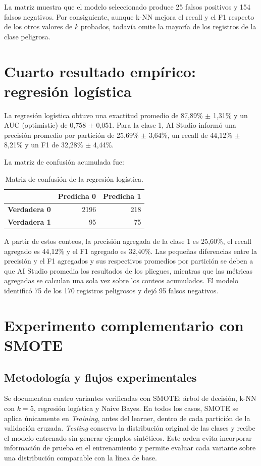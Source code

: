 \documentclass[12pt,a4paper]{article}
\begin{document}
La matriz muestra que el modelo seleccionado produce 25 falsos positivos y 154 falsos negativos. Por consiguiente, aunque k-NN mejora el recall y el F1 respecto de los otros valores de $k$ probados, todavía omite la mayoría de los registros de la clase peligrosa.

\section{Cuarto resultado empírico: regresión logística}
La regresión logística obtuvo una exactitud promedio de 87,89\% $\pm$ 1,31\% y un AUC (optimistic) de 0,758 $\pm$ 0,051. Para la clase 1, AI Studio informó una precisión promedio por partición de 25,69\% $\pm$ 3,64\%, un recall de 44,12\% $\pm$ 8,21\% y un F1 de 32,28\% $\pm$ 4,44\%.

La matriz de confusión acumulada fue:
\begin{table}[H]
\centering
\caption{Matriz de confusión de la regresión logística.}
\label{tab:logistic-matrix}
\begin{tabular}{lrr}
\toprule
 & \textbf{Predicha 0} & \textbf{Predicha 1} \\
\midrule
\textbf{Verdadera 0} & 2196 & 218 \\
\textbf{Verdadera 1} & 95 & 75 \\
\bottomrule
\end{tabular}
\end{table}

A partir de estos conteos, la precisión agregada de la clase 1 es 25,60\%, el recall agregado es 44,12\% y el F1 agregado es 32,40\%. Las pequeñas diferencias entre la precisión y el F1 agregados y sus respectivos promedios por partición se deben a que AI Studio promedia los resultados de los pliegues, mientras que las métricas agregadas se calculan una sola vez sobre los conteos acumulados. El modelo identificó 75 de los 170 registros peligrosos y dejó 95 falsos negativos.

\section{Experimento complementario con SMOTE}
\subsection{Metodología y flujos experimentales}
Se documentan cuatro variantes verificadas con SMOTE: árbol de decisión, k-NN con $k=5$, regresión logística y Naive Bayes. En todos los casos, SMOTE se aplica únicamente en \textit{Training}, antes del learner, dentro de cada partición de la validación cruzada. \textit{Testing} conserva la distribución original de las clases y recibe el modelo entrenado sin generar ejemplos sintéticos. Este orden evita incorporar información de prueba en el entrenamiento y permite evaluar cada variante sobre una distribución comparable con la línea de base.
\end{document}
